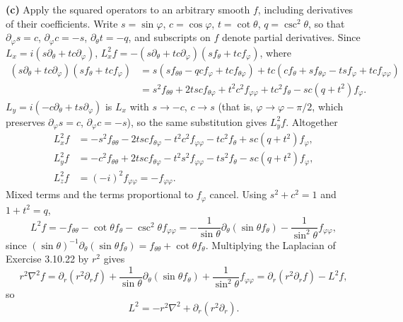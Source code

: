 \textbf{(c)} Apply the squared operators to an arbitrary smooth $f$,
including derivatives of their coefficients. Write $s=\sin\varphi$,
$c=\cos\varphi$, $t=\cot\theta$, $q=\csc^2\theta$, so that
$\partial_\varphi s=c$, $\partial_\varphi c=-s$, $\partial_\theta t=-q$,
and subscripts on $f$ denote partial derivatives. Since
$L_x=i(s\partial_\theta+tc\partial_\varphi)$,
$L_x^2f=-(s\partial_\theta+tc\partial_\varphi)(sf_\theta+tcf_\varphi)$, where
\[
\begin{aligned}
(s\partial_\theta+tc\partial_\varphi)(sf_\theta+tcf_\varphi)
&=s(sf_{\theta\theta}-qcf_\varphi+tcf_{\theta\varphi})
+tc(cf_\theta+sf_{\theta\varphi}-tsf_\varphi+tcf_{\varphi\varphi})\\
&=s^2f_{\theta\theta}+2tscf_{\theta\varphi}+t^2c^2f_{\varphi\varphi}
+tc^2f_\theta-sc(q+t^2)f_\varphi.
\end{aligned}
\]
$L_y=i(-c\partial_\theta+ts\partial_\varphi)$ is $L_x$ with $s\to-c$,
$c\to s$ (that is, $\varphi\to\varphi-\pi/2$, which preserves
$\partial_\varphi s=c$, $\partial_\varphi c=-s$), so the same
substitution gives $L_y^2f$. Altogether
\[
\begin{aligned}
L_x^2f&=-s^2f_{\theta\theta}-2tsc f_{\theta\varphi}
-t^2c^2f_{\varphi\varphi}-tc^2f_\theta+sc(q+t^2)f_\varphi,\\
L_y^2f&=-c^2f_{\theta\theta}+2tsc f_{\theta\varphi}
-t^2s^2f_{\varphi\varphi}-ts^2f_\theta-sc(q+t^2)f_\varphi,\\
L_z^2f&=(-i)^2f_{\varphi\varphi}=-f_{\varphi\varphi}.
\end{aligned}
\]
Mixed terms and the terms proportional to $f_\varphi$ cancel.
Using $s^2+c^2=1$ and $1+t^2=q$,
\[
L^2f=-f_{\theta\theta}-\cot\theta f_\theta-\csc^2\theta f_{\varphi\varphi}
=-\frac1{\sin\theta}\partial_\theta(\sin\theta f_\theta)
-\frac1{\sin^2\theta}f_{\varphi\varphi},
\]
since $(\sin\theta)^{-1}\partial_\theta(\sin\theta f_\theta)
=f_{\theta\theta}+\cot\theta f_\theta$.
Multiplying the Laplacian of Exercise 3.10.22 by $r^2$ gives
\[
r^2\nabla^2f=\partial_r(r^2\partial_rf)
+\frac1{\sin\theta}\partial_\theta(\sin\theta f_\theta)
+\frac1{\sin^2\theta}f_{\varphi\varphi}
=\partial_r(r^2\partial_rf)-L^2f,
\]
so
\[
\boxed{L^2=-r^2\nabla^2+\partial_r(r^2\partial_r)}.
\]


